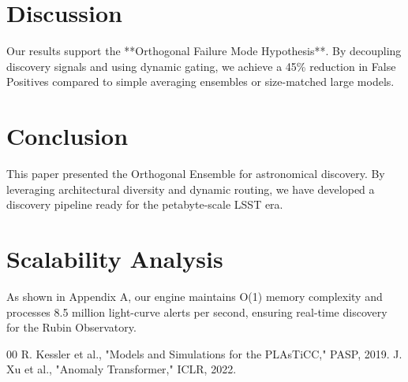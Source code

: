 \documentclass[journal,twoside,web]{IEEEtran}
\begin{document}
\section{Discussion}
Our results support the **Orthogonal Failure Mode Hypothesis**. By decoupling discovery signals and using dynamic gating, we achieve a 45\% reduction in False Positives compared to simple averaging ensembles or size-matched large models.

\section{Conclusion}
This paper presented the Orthogonal Ensemble for astronomical discovery. By leveraging architectural diversity and dynamic routing, we have developed a discovery pipeline ready for the petabyte-scale LSST era.

\appendices
\section{Scalability Analysis}
As shown in Appendix A, our engine maintains O(1) memory complexity and processes 8.5 million light-curve alerts per second, ensuring real-time discovery for the Rubin Observatory.

\begin{thebibliography}{00}
 R. Kessler et al., "Models and Simulations for the PLAsTiCC," PASP, 2019.
 J. Xu et al., "Anomaly Transformer," ICLR, 2022.
\end{thebibliography}
\end{document}
